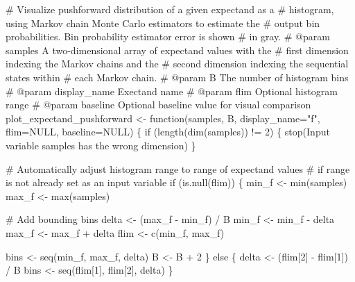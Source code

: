 \documentclass[
  letterpaper,
  DIV=11,
  numbers=noendperiod]{scrartcl}
\newenvironment{Shaded}{\begin{snugshade}}{\end{snugshade}}
\newcommand{\BuiltInTok}[1]{\textcolor[rgb]{0.00,0.23,0.31}{#1}}
\newcommand{\CommentTok}[1]{\textcolor[rgb]{0.37,0.37,0.37}{#1}}
\newcommand{\ControlFlowTok}[1]{\textcolor[rgb]{0.00,0.23,0.31}{#1}}
\newcommand{\DecValTok}[1]{\textcolor[rgb]{0.68,0.00,0.00}{#1}}
\newcommand{\KeywordTok}[1]{\textcolor[rgb]{0.00,0.23,0.31}{#1}}
\newcommand{\NormalTok}[1]{\textcolor[rgb]{0.00,0.23,0.31}{#1}}
\newcommand{\OperatorTok}[1]{\textcolor[rgb]{0.37,0.37,0.37}{#1}}
\newcommand{\StringTok}[1]{\textcolor[rgb]{0.13,0.47,0.30}{#1}}
\begin{document}
\begin{Shaded}
\begin{Highlighting}[]
\CommentTok{\# Visualize pushforward distribution of a given expectand as a }
\CommentTok{\# histogram, using Markov chain Monte Carlo estimators to estimate the }
\CommentTok{\# output bin probabilities.  Bin probability estimator error is shown }
\CommentTok{\# in gray.}
\CommentTok{\# @param samples A two{-}dimensional array of expectand values with the }
\CommentTok{\#                first dimension indexing the Markov chains and the }
\CommentTok{\#                second dimension indexing the sequential states within }
\CommentTok{\#                each Markov chain.}
\CommentTok{\# @param B The number of histogram bins}
\CommentTok{\# @param display\_name Exectand name}
\CommentTok{\# @param flim Optional histogram range}
\CommentTok{\# @param baseline Optional baseline value for visual comparison}
\NormalTok{plot\_expectand\_pushforward }\OperatorTok{\textless{}{-}}\NormalTok{ function(samples, B, display\_name}\OperatorTok{=}\StringTok{"f"}\NormalTok{, }
\NormalTok{                                       flim}\OperatorTok{=}\NormalTok{NULL, baseline}\OperatorTok{=}\NormalTok{NULL) \{}
  \ControlFlowTok{if}\NormalTok{ (length(dim(samples)) }\OperatorTok{!=} \DecValTok{2}\NormalTok{) \{}
\NormalTok{    stop(}\StringTok{\textquotesingle{}Input variable \textasciigrave{}samples\textasciigrave{} has the wrong dimension\textquotesingle{}}\NormalTok{)}
\NormalTok{  \}}
  
  \CommentTok{\# Automatically adjust histogram range to range of expectand values}
  \CommentTok{\# if range is not already set as an input variable}
  \ControlFlowTok{if}\NormalTok{ (}\KeywordTok{is}\NormalTok{.null(flim)) \{}
\NormalTok{    min\_f }\OperatorTok{\textless{}{-}} \BuiltInTok{min}\NormalTok{(samples)}
\NormalTok{    max\_f }\OperatorTok{\textless{}{-}} \BuiltInTok{max}\NormalTok{(samples)}
    
    \CommentTok{\# Add bounding bins}
\NormalTok{    delta }\OperatorTok{\textless{}{-}}\NormalTok{ (max\_f }\OperatorTok{{-}}\NormalTok{ min\_f) }\OperatorTok{/}\NormalTok{ B}
\NormalTok{    min\_f }\OperatorTok{\textless{}{-}}\NormalTok{ min\_f }\OperatorTok{{-}}\NormalTok{ delta}
\NormalTok{    max\_f }\OperatorTok{\textless{}{-}}\NormalTok{ max\_f }\OperatorTok{+}\NormalTok{ delta}
\NormalTok{    flim }\OperatorTok{\textless{}{-}}\NormalTok{ c(min\_f, max\_f)}
    
\NormalTok{    bins }\OperatorTok{\textless{}{-}}\NormalTok{ seq(min\_f, max\_f, delta)}
\NormalTok{    B }\OperatorTok{\textless{}{-}}\NormalTok{ B }\OperatorTok{+} \DecValTok{2}
\NormalTok{  \} }\ControlFlowTok{else}\NormalTok{ \{}
\NormalTok{    delta }\OperatorTok{\textless{}{-}}\NormalTok{ (flim[}\DecValTok{2}\NormalTok{] }\OperatorTok{{-}}\NormalTok{ flim[}\DecValTok{1}\NormalTok{]) }\OperatorTok{/}\NormalTok{ B}
\NormalTok{    bins }\OperatorTok{\textless{}{-}}\NormalTok{ seq(flim[}\DecValTok{1}\NormalTok{], flim[}\DecValTok{2}\NormalTok{], delta)}
\NormalTok{  \}}
  

\end{Highlighting}
\end{Shaded}
\end{document}
